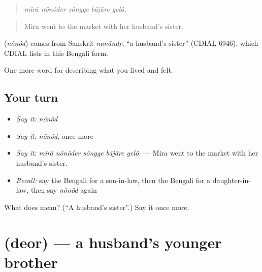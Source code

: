 \begin{quote}
    
\end{quote}

\begin{quote}
\emph{mīrā nônôder sôngge bājāre gelô.}
\end{quote}

\begin{quote}
Mira went to the market with her husband's sister.
\end{quote}

\begin{cousinweb}
\textbf{} (\emph{nônôd}) comes from Sanskrit \emph{nanāndṛ}, \textquotedblleft{}a husband's sister\textquotedblright{} (CDIAL 6946), which CDIAL lists in this Bengali form.
\end{cousinweb}

\begin{grammarlens}[title={What you've built}]
One more word for describing what you lived and felt.
\end{grammarlens}

\subsection*{Your turn}
\begin{itemize}
\raggedright
  \item \emph{Say it:} \emph{nônôd}
  \item \emph{Say it:} \emph{nônôd}, once more
  \item \emph{Say it:} \emph{mīrā nônôder sôngge bājāre gelô.} — Mira went to the market with her husband's sister.
  \item \emph{Recall:} say the Bengali for a son-in-law, then the Bengali for a daughter-in-law, then say \emph{nônôd} again
\end{itemize}

\begin{tcolorbox}[breakable,colback=teal!4,colframe=teal!35!black,title={Before you move on}]
What does  mean? (\textquotedblleft{}A husband's sister\textquotedblright{}.) Say it once more.
\end{tcolorbox}
\section[\texorpdfstring{\bn{দেওর} (deor)}{দেওর (deor)}]{ (deor) — a husband's younger brother}

\label{lesson:BN-C483-deor}



